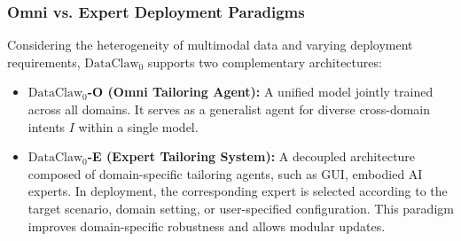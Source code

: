 \subsubsection{Omni vs. Expert Deployment Paradigms}

Considering the heterogeneity of multimodal data and varying deployment requirements, $\text{DataClaw}_0$ supports two complementary architectures:
\begin{itemize}[leftmargin=20pt, labelsep=4pt]
    \item \textbf{$\text{DataClaw}_0$-O (Omni Tailoring Agent):} A unified model jointly trained across all domains. It serves as a generalist agent for diverse cross-domain intents \(I\) within a single model.
    
    \item \textbf{$\text{DataClaw}_0$-E (Expert Tailoring System):} A decoupled architecture composed of domain-specific tailoring agents, such as GUI, embodied AI experts. In deployment, the corresponding expert is selected according to the target scenario, domain setting, or user-specified configuration. This paradigm improves domain-specific robustness and allows modular updates.
\end{itemize}







